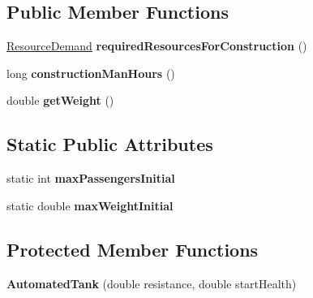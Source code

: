 \subsection*{Public Member Functions}
\begin{DoxyCompactItemize}
\item 
\hyperlink{classuniverse_1_1_resource_demand}{Resource\+Demand} {\bfseries required\+Resources\+For\+Construction} ()\hypertarget{classtools_1_1vehicles_1_1land_1_1_automated_tank_a5d563113a8c5de518656693a0fc2c5b3}{}\label{classtools_1_1vehicles_1_1land_1_1_automated_tank_a5d563113a8c5de518656693a0fc2c5b3}

\item 
long {\bfseries construction\+Man\+Hours} ()\hypertarget{classtools_1_1vehicles_1_1land_1_1_automated_tank_aa8988b642f2bbb237c0cd81deeb5a994}{}\label{classtools_1_1vehicles_1_1land_1_1_automated_tank_aa8988b642f2bbb237c0cd81deeb5a994}

\item 
double {\bfseries get\+Weight} ()\hypertarget{classtools_1_1vehicles_1_1land_1_1_automated_tank_a59df4f63606a0d166c2d5b145f878c17}{}\label{classtools_1_1vehicles_1_1land_1_1_automated_tank_a59df4f63606a0d166c2d5b145f878c17}

\end{DoxyCompactItemize}
\subsection*{Static Public Attributes}
\begin{DoxyCompactItemize}
\item 
static int {\bfseries max\+Passengers\+Initial}\hypertarget{classtools_1_1vehicles_1_1land_1_1_automated_tank_a2c87691ad2a9cc410e2962f5c644ee95}{}\label{classtools_1_1vehicles_1_1land_1_1_automated_tank_a2c87691ad2a9cc410e2962f5c644ee95}

\item 
static double {\bfseries max\+Weight\+Initial}\hypertarget{classtools_1_1vehicles_1_1land_1_1_automated_tank_a54597e27ade4f31a68e963da8d8a3128}{}\label{classtools_1_1vehicles_1_1land_1_1_automated_tank_a54597e27ade4f31a68e963da8d8a3128}

\end{DoxyCompactItemize}
\subsection*{Protected Member Functions}
\begin{DoxyCompactItemize}
\item 
{\bfseries Automated\+Tank} (double resistance, double start\+Health)\hypertarget{classtools_1_1vehicles_1_1land_1_1_automated_tank_a7220014a068629fff6891ee7e802db51}{}\label{classtools_1_1vehicles_1_1land_1_1_automated_tank_a7220014a068629fff6891ee7e802db51}

\end{DoxyCompactItemize}
